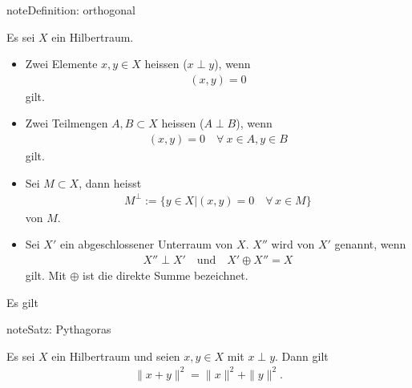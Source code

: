\documentclass[letterpaper,10pt,english]{jupyterBook}
\begin{document}
\begin{sphinxadmonition}{note}{Definition: orthogonal}

Es sei \(X\) ein Hilbertraum.
\begin{itemize}
\item {} 
Zwei Elemente \(x,y \in X\) heissen  (\(x\perp y\)), wenn
\begin{equation*}
\begin{split}(x,y) = 0\end{split}
\end{equation*}
gilt.

\item {} 
Zwei Teilmengen \(A,B \subset X\) heissen  (\(A\perp B\)), wenn
\begin{equation*}
\begin{split}(x,y) = 0 \quad \forall\ x\in A, y\in B\end{split}
\end{equation*}
gilt.

\item {} 
Sei \(M\subset X\), dann heisst
\begin{equation*}
\begin{split}M^\perp := \{y\in X | (x,y)=0\quad\forall\,x\in M\}\end{split}
\end{equation*}
 von \(M\).

\item {} 
Sei \(X'\) ein abgeschlossener Unterraum von \(X\). \(X''\) wird  von \(X'\) genannt, wenn
\begin{equation*}
\begin{split}X''\perp X' \quad \text{und}\quad X' \oplus X'' = X\end{split}
\end{equation*}
gilt. Mit \(\oplus\) ist die direkte Summe bezeichnet.

\end{itemize}
\end{sphinxadmonition}

Es gilt

\begin{sphinxadmonition}{note}{Satz: Pythagoras}

Es sei \(X\) ein Hilbertraum und seien \(x,y \in X\) mit \(x\perp y\). Dann gilt
\begin{equation*}
\begin{split}\|x+y\|^2 = \|x\|^2 + \|y\|^2.\end{split}
\end{equation*}\end{sphinxadmonition}
\end{document}
